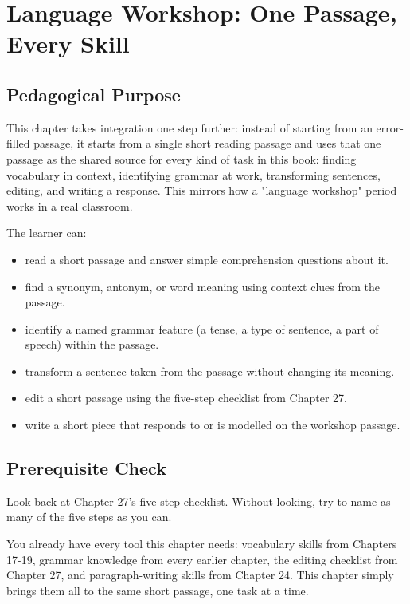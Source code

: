 
\chapter{Language Workshop: One Passage, Every Skill}

\section{Pedagogical Purpose}
This chapter takes integration one step further: instead of starting from an error-filled passage, it starts from a single short reading passage and uses that one passage as the shared source for every kind of task in this book: finding vocabulary in context, identifying grammar at work, transforming sentences, editing, and writing a response. This mirrors how a "language workshop" period works in a real classroom.

\begin{learningobjectives}
The learner can:
\begin{itemize}
    \item read a short passage and answer simple comprehension questions about it.
    \item find a synonym, antonym, or word meaning using context clues from the passage.
    \item identify a named grammar feature (a tense, a type of sentence, a part of speech) within the passage.
    \item transform a sentence taken from the passage without changing its meaning.
    \item edit a short passage using the five-step checklist from Chapter 27.
    \item write a short piece that responds to or is modelled on the workshop passage.
\end{itemize}
\end{learningobjectives}

\section{Prerequisite Check}
\begin{quickcheck}
Look back at Chapter 27's five-step checklist. Without looking, try to name as many of the five steps as you can.
\end{quickcheck}

\begin{rememberbox}
You already have every tool this chapter needs: vocabulary skills from Chapters 17-19, grammar knowledge from every earlier chapter, the editing checklist from Chapter 27, and paragraph-writing skills from Chapter 24. This chapter simply brings them all to the same short passage, one task at a time.
\end{rememberbox}

